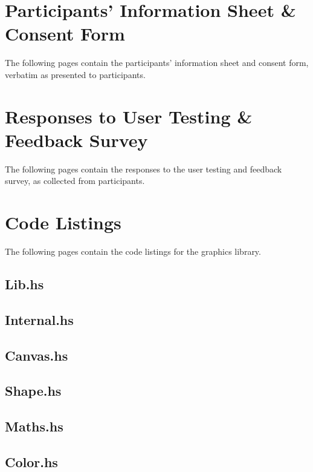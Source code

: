 \documentclass[../main.tex]{subfiles}
\begin{document}
\appendix
    \chapter{Participants' Information Sheet \& Consent Form}
        The following pages contain the participants' information sheet and consent
            form, verbatim as presented to participants.

        \begin{center}
            
        \end{center}

    \chapter{Responses to User Testing \& Feedback Survey}
        The following pages contain the responses to the user testing and feedback
            survey, as collected from participants.

    \chapter{Code Listings} \label{app:code}
        The following pages contain the code listings for the graphics library.
        \section*{Lib.hs}
            
        \section*{Internal.hs}
            
        \section*{Canvas.hs}
            
        \section*{Shape.hs}
            
        \section*{Maths.hs}
            
        \section*{Color.hs}
            
\end{document}
